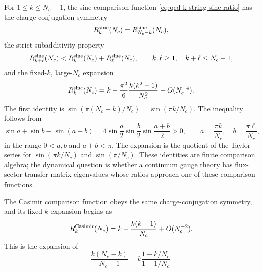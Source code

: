 For \(1\le k\le N_c-1\), the sine comparison function
\eqref{eq:qcd-k-string-sine-ratio} has the charge-conjugation symmetry
\[
  R_k^{\rm sine}(N_c)=R_{N_c-k}^{\rm sine}(N_c),
\]
the strict subadditivity property
\begin{equation}
  R_{k+\ell}^{\rm sine}(N_c)
  <
  R_k^{\rm sine}(N_c)+R_\ell^{\rm sine}(N_c),
  \qquad
  k,\ell\ge1,\quad k+\ell\le N_c-1,
  \label{eq:qcd-sine-subadditivity}
\end{equation}
and the fixed-\(k\), large-\(N_c\) expansion
\begin{equation}
  R_k^{\rm sine}(N_c)
  =
  k-\frac{\pi^2}{6}\frac{k(k^2-1)}{N_c^2}
  +O(N_c^{-4}).
  \label{eq:qcd-sine-large-n}
\end{equation}
The first identity is
\(\sin(\pi(N_c-k)/N_c)=\sin(\pi k/N_c)\).  The inequality follows from
\[
  \sin a+\sin b-\sin(a+b)
  =
  4\sin\frac a2\sin\frac b2\sin\frac{a+b}{2}>0,
  \qquad
  a=\frac{\pi k}{N_c},\quad b=\frac{\pi\ell}{N_c},
\]
in the range \(0<a,b\) and \(a+b<\pi\).  The expansion is the quotient of
the Taylor series for \(\sin(\pi k/N_c)\) and \(\sin(\pi/N_c)\).  These
identities are finite comparison algebra; the dynamical question is whether a
continuum gauge theory has flux-sector transfer-matrix eigenvalues whose
ratios approach one of these comparison functions.

The Casimir comparison function obeys the same charge-conjugation symmetry,
and its fixed-\(k\) expansion begins as
\begin{equation}
  R_k^{\rm Casimir}(N_c)
  =
  k-\frac{k(k-1)}{N_c}+O(N_c^{-2}).
  \label{eq:qcd-casimir-large-n}
\end{equation}
This is the expansion of
\[
  \frac{k(N_c-k)}{N_c-1}
  =
  k\frac{1-k/N_c}{1-1/N_c}.
\]

